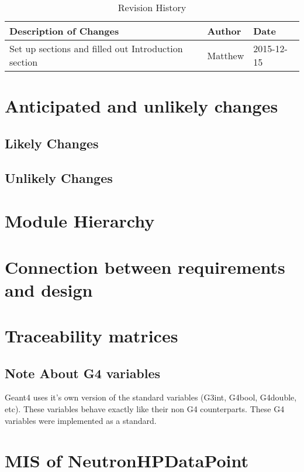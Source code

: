 \documentclass[12pt]{article}
\begin{document}
\begin{table}[h]
\centering
\caption{Revision History}\label{Table_Revision}
\begin{tabular}{lll}

\toprule
\bf Description of Changes & \bf Author & \bf Date\\\midrule
Set up sections and filled out Introduction section & Matthew & 2015-12-15\\
\bottomrule
\end{tabular}
\end{table}

\section{Anticipated and unlikely changes}
\subsection{Likely Changes} %

\subsection{Unlikely Changes} %

\section{Module Hierarchy}%

\section{Connection between requirements and design}%

\section{Traceability matrices}%
\subsection{Note About G4 variables}
Geant4 uses it's own version of the standard variables (G3int, G4bool, G4double, etc). These variables behave exactly like their non G4 counterparts. These G4 variables were implemented as a standard.

\section{MIS of NeutronHPDataPoint}
\end{document}
